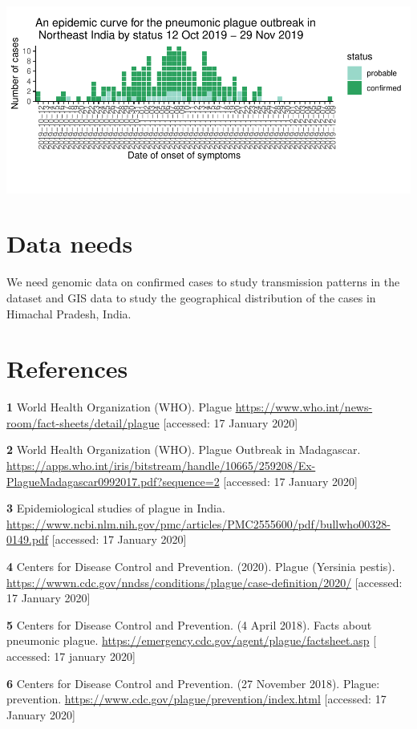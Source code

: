 \documentclass[
]{article}
\begin{document}
\begin{flushleft}\includegraphics{Plague_SitRep_files/figure-latex/unnamed-chunk-3-1} \end{flushleft}

\hypertarget{data-needs}{%
\section{Data needs}\label{data-needs}}

We need genomic data on confirmed cases to study transmission patterns
in the dataset and GIS data to study the geographical distribution of
the cases in Himachal Pradesh, India.

\hypertarget{references}{%
\section{References}\label{references}}

\textbf{1} World Health Organization (WHO). Plague
\url{https://www.who.int/news-room/fact-sheets/detail/plague}
{[}accessed: 17 January 2020{]}

\textbf{2} World Health Organization (WHO). Plague Outbreak in
Madagascar.
\url{https://apps.who.int/iris/bitstream/handle/10665/259208/Ex-PlagueMadagascar0992017.pdf?sequence=2}
{[}accessed: 17 January 2020{]}

\textbf{3} Epidemiological studies of plague in India.
\url{https://www.ncbi.nlm.nih.gov/pmc/articles/PMC2555600/pdf/bullwho00328-0149.pdf}
{[}accessed: 17 January 2020{]}

\textbf{4} Centers for Disease Control and Prevention. (2020). Plague
(Yersinia pestis).
\url{https://wwwn.cdc.gov/nndss/conditions/plague/case-definition/2020/}
{[}accessed: 17 January 2020{]}

\textbf{5} Centers for Disease Control and Prevention. (4 April 2018).
Facts about pneumonic plague.
\url{https://emergency.cdc.gov/agent/plague/factsheet.asp} {[} accessed:
17 january 2020{]}

\textbf{6} Centers for Disease Control and Prevention. (27 November
2018). Plague: prevention.
\url{https://www.cdc.gov/plague/prevention/index.html} {[}accessed: 17
January 2020{]}
\end{document}
